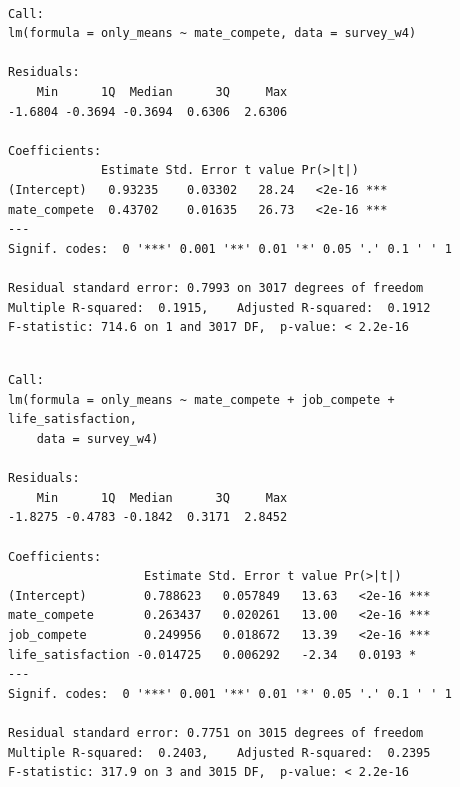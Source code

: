 \documentclass[
]{article}
\begin{document}
\begin{table}

\caption{\textbf{?(caption)}}\begin{minipage}[t]{\linewidth}

{\centering 

\begin{verbatim}

Call:
lm(formula = only_means ~ mate_compete, data = survey_w4)

Residuals:
    Min      1Q  Median      3Q     Max 
-1.6804 -0.3694 -0.3694  0.6306  2.6306 

Coefficients:
             Estimate Std. Error t value Pr(>|t|)    
(Intercept)   0.93235    0.03302   28.24   <2e-16 ***
mate_compete  0.43702    0.01635   26.73   <2e-16 ***
---
Signif. codes:  0 '***' 0.001 '**' 0.01 '*' 0.05 '.' 0.1 ' ' 1

Residual standard error: 0.7993 on 3017 degrees of freedom
Multiple R-squared:  0.1915,    Adjusted R-squared:  0.1912 
F-statistic: 714.6 on 1 and 3017 DF,  p-value: < 2.2e-16
\end{verbatim}

}

\end{minipage}%
\newline
\begin{minipage}[t]{\linewidth}

{\centering 

\begin{verbatim}

Call:
lm(formula = only_means ~ mate_compete + job_compete + life_satisfaction, 
    data = survey_w4)

Residuals:
    Min      1Q  Median      3Q     Max 
-1.8275 -0.4783 -0.1842  0.3171  2.8452 

Coefficients:
                   Estimate Std. Error t value Pr(>|t|)    
(Intercept)        0.788623   0.057849   13.63   <2e-16 ***
mate_compete       0.263437   0.020261   13.00   <2e-16 ***
job_compete        0.249956   0.018672   13.39   <2e-16 ***
life_satisfaction -0.014725   0.006292   -2.34   0.0193 *  
---
Signif. codes:  0 '***' 0.001 '**' 0.01 '*' 0.05 '.' 0.1 ' ' 1

Residual standard error: 0.7751 on 3015 degrees of freedom
Multiple R-squared:  0.2403,    Adjusted R-squared:  0.2395 
F-statistic: 317.9 on 3 and 3015 DF,  p-value: < 2.2e-16
\end{verbatim}

}


\end{minipage}
\end{table}
\end{document}

